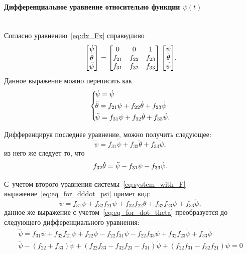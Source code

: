 \documentclass[12pt,a4paper,openany]{extarticle}
\begin{document}
\paragraph*{Дифференциальное уравнение относительно функции $\psi(t)$}$\phantom{-}$\\
\hspace*{\parindent}Согласно уравнению~\eqref{eq:dx_Fx} справедливо
\begin{equation}
\begin{bmatrix}
\dot\psi \\ \ddot\theta \\ \ddot\psi
\end{bmatrix}
=
\begin{bmatrix}
0      & 0      & 1\\
f_{21} & f_{22} & f_{23}\\
f_{31} & f_{32} & f_{33}
\end{bmatrix}
\begin{bmatrix}
\psi \\ \dot\theta \\ \dot\psi
\end{bmatrix}\!\!\ldotp
\end{equation}
Данное выражение можно переписать как
\begin{equation}\label{eq:system_with_F}
	\left\{
	\begin{aligned}
		\!&\dot\psi = \dot\psi \\
		\!&\ddot\theta = f_{21}\psi + f_{22}\dot\theta + f_{23}\dot\psi\\
		\!&\ddot\psi = f_{31}\psi + f_{32}\dot\theta + f_{33}\dot\psi\ldotp
	\end{aligned}
	\right.
\end{equation}

Дифференцируя последнее уравнение, можно получить следующее:
\begin{equation}\label{eq:eq_for_dddot_psi}
\dddot\psi = f_{31}\dot\psi + f_{32}\ddot\theta + f_{33}\ddot\psi,
\end{equation}
из него же следует то, что
\begin{equation}\label{eq:eq_for_dot_theta}
f_{32}\dot\theta = \ddot\psi - f_{31}\psi - f_{33}\dot\psi\ldotp
\end{equation}

С~учетом второго уравнения системы~\eqref{eq:system_with_F} выражение~\eqref{eq:eq_for_dddot_psi} примет вид:
\begin{equation}
\dddot\psi = f_{31}\dot\psi + f_{32}f_{21}\psi + f_{32}f_{22}\dot\theta + f_{32}f_{23}\dot\psi + f_{33}\ddot\psi,
\end{equation}
данное же выражение с учетом~\eqref{eq:eq_for_dot_theta} преобразуется до следующего дифференциального уравнения:
\begin{gather}
\dddot\psi = f_{31}\dot\psi + f_{32}f_{21}\psi + f_{22}\ddot\psi - f_{22}f_{31}\psi - f_{22}f_{33}\dot\psi + f_{32}f_{23}\dot\psi + f_{33}\ddot\psi\\
\dddot\psi - (f_{22}+f_{33})\ddot\psi + (f_{22}f_{33}-f_{32}f_{23}-f_{31})\dot\psi + (f_{22}f_{31} - f_{32}f_{21})\psi = 0
\end{gather}
\end{document}
